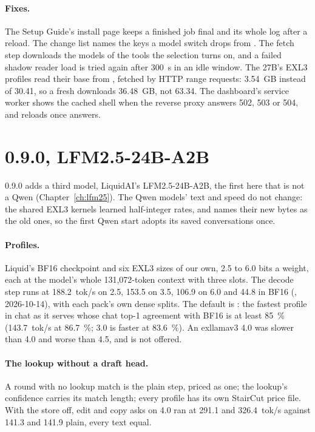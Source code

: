 \paragraph{Fixes.} The Setup Guide's install page keeps a finished job final and its whole log after a reload. The change list names the keys a model switch drops from . The fetch step downloads the models of the tools the selection turns on, and a failed shadow reader load is tried again after 300~s in an idle window. The 27B's EXL3 profiles read their base from , fetched by HTTP range requests: 3.54~GB instead of 30.41, so a fresh  downloads 36.48~GB, not 63.34. The dashboard's service worker shows the cached shell when the reverse proxy answers 502, 503 or 504, and reloads once  answers.

\section{0.9.0, LFM2.5-24B-A2B}\label{sec:changelog-090}

0.9.0 adds a third model, LiquidAI's LFM2.5-24B-A2B, the first here that is not a Qwen (Chapter~\ref{ch:lfm25}). The Qwen models' text and speed do not change: the shared EXL3 kernels learned half-integer rates, and  names their new bytes as the old ones, so the first Qwen start adopts its saved conversations once.

\paragraph{Profiles.} Liquid's BF16 checkpoint and six EXL3 sizes of our own, 2.5 to 6.0 bits a weight, each at the model's whole 131,072-token context with three slots. The decode step runs at 188.2~tok/s on 2.5, 153.5 on 3.5, 106.9 on 6.0 and 44.8 in BF16 (\measured, 2026-10-14), with each pack's own dense splits. The default is : the fastest profile in chat as it serves whose chat top-1 agreement with BF16 is at least 85~\% (143.7~tok/s at 86.7~\%; 3.0 is faster at 83.6~\%). An exllamav3  4.0 was slower than 4.0 and worse than 4.5, and is not offered.

\paragraph{The lookup without a draft head.} A round with no lookup match is the plain step, priced as one; the lookup's confidence carries its match length; every profile has its own StairCut price file. With the store off, edit and copy asks on 4.0 ran at 291.1 and 326.4~tok/s against 141.3 and 141.9 plain, every text equal.

